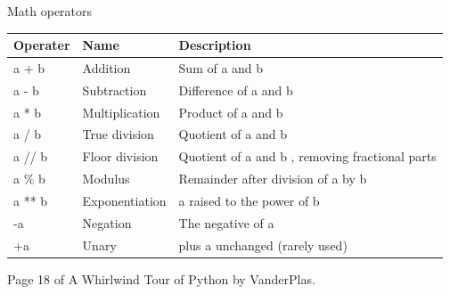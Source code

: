 \documentclass[10pt]{beamer}
\begin{document}
\begin{frame}{Math operators}
\begin{table}
\begin{tabular}{lll}
\textbf{Operater} & \textbf{Name} & \textbf{Description} \\
\hline
a + b & Addition & Sum of a and b \\
a - b & Subtraction & Difference of a and b \\
a * b & Multiplication & Product of a and b \\
a / b & True division & Quotient of a and b \\
a // b & Floor division & Quotient of a and b , removing fractional parts \\
a \% b  & Modulus & Remainder after division of a by b \\
a ** b & Exponentiation & a raised to the power of b \\
-a & Negation & The negative of a \\
+a & Unary & plus a unchanged (rarely used) \\
\end{tabular}
\end{table}

Page 18 of A Whirlwind Tour of Python by VanderPlas.
\end{frame}


\end{document}
